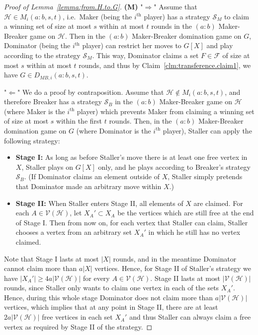 \documentclass[10pt,a4paper]{amsart}
\newcommand{\calH}{\mathcal{H}}
\newcommand{\calV}{\mathcal{V}}
\begin{document}
\begin{proof}[Proof of Lemma~\ref{lemma:from.H.to.G}]

\textbf{(M)} 
"$\Rightarrow$" 
Assume that $\mathcal{H} \in M_i(a:b,s,t)$, i.e.~Maker (being the $i^{\text{th}}$ player) has a strategy $\mathcal{S}_M$ to claim a winning set of size at most $s$ within at most $t$ rounds in the $(a:b)$ Maker-Breaker game on $\mathcal{H}$.
Then in the $(a:b)$ Maker-Breaker domination game on $G$, Dominator (being the $i^{\text{th}}$ player) can restrict her moves to $G[X]$ and play according to the strategy $\mathcal{S}_M$. 
This way, Dominator claims a set $F\in \mathcal{F}$ of size at most $s$ within at most $t$ rounds, and thus by Claim~\ref{clm:transference.claim1}, we have $G \in D_{MB,i}(a:b,s,t)$.



"$\Leftarrow$" We do a proof by contraposition. Assume that 
$\mathcal{H} \notin M_i(a:b,s,t)$, and therefore
Breaker has a strategy $\mathcal{S}_B$ 
in the $(a:b)$ Maker-Breaker game on $\calH$ 
(where Maker is the $i^{\text{th}}$ player)
which prevents Maker from claiming a winning set of size
at most $s$ within the first $t$ rounds. Then, in the $(a:b)$ Maker-Breaker domination game on $G$
(where Dominator is the $i^{\text{th}}$ player),
Staller can apply the following strategy:
\begin{itemize}
\item[] \textbf{Stage I:} As long as before Staller's move there is at least one free vertex in $X$,
Staller plays on $G[X]$ only, and he plays according to Breaker's 
strategy $\mathcal{S}_B$. (If Dominator claims an element
outside of $X$, Staller simply pretends that Dominator made an arbitrary move within $X$.)
\item[] \textbf{Stage II:} When Staller enters Stage II, all elements of $X$ are claimed. For each $A\in \calV(\calH)$,
let $X_A'\subset X_A$ be the vertices which are still free at the end of Stage I. Then from now on, for each vertex that Staller can claim,
Staller chooses a vertex from an arbitrary set $X_A'$ in which he still has no vertex claimed.
\end{itemize}

Note that Stage I lasts at most $|X|$
rounds, and in the meantime Dominator cannot claim more than $a|X|$ vertices. Hence, for 
Stage II of Staller's strategy we have $|X_A'|\geq 4a|\calV(\calH)|$ for every $A\in \calV(\calH)$.
Stage II lasts at most $|\calV(\calH)|$ rounds,
since Staller only wants to claim one vertex in each of the sets $X_A'$. Hence, during this whole stage Dominator does not claim more than $a|\calV(\calH)|$ vertices, which implies that at any point in Stage II, there are at least $2a|\calV(\calH)|$
free vertices in each set $X_A'$ and thus
Staller can always claim a free vertex as required by Stage II of the strategy.  



\end{proof}
\end{document}
